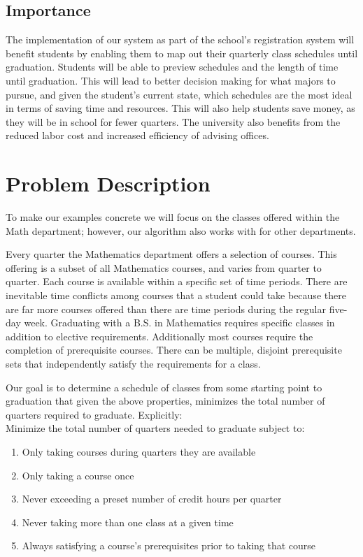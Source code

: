 \documentclass[11pt]{article} %
\begin{document}
\subsection{Importance} The implementation of our system as part of the school’s
registration system will benefit students by enabling them to map out their
quarterly class schedules until graduation. Students will be able to preview
schedules and the length of time until graduation.  This will lead to better
decision making for what majors to pursue, and given the student's current
state, which schedules are the most ideal in terms of saving time and resources.
This will also help students save money, as they will be in school for fewer
quarters. The university also benefits from the reduced labor cost and increased
efficiency of advising offices.

\section{Problem Description} \label{pdesc} To make our examples concrete we will focus on the
classes offered within the Math department; however, our algorithm also works with for other departments.

Every quarter the Mathematics department offers a selection of courses. This offering is a
subset of all Mathematics courses, and varies from quarter to quarter.
Each course is available within a specific set of
time periods. There are inevitable time conflicts among courses that a student
could take because there are far more courses offered than there are time periods during
the regular five-day week. Graduating with a B.S. in Mathematics requires
specific classes in addition to elective requirements.
Additionally most courses require the completion of prerequisite courses.
There can be multiple, disjoint prerequisite sets that independently
satisfy the requirements for a class.

Our goal is to determine a schedule of classes from some starting point to
graduation that given the above properties, minimizes the total number of
quarters required to graduate. Explicitly: \\ Minimize the total
number of quarters needed to graduate subject to: \begin{enumerate} \item Only
taking courses during quarters they are available \item Only taking a course
once \item Never exceeding a preset number of credit hours per quarter \item
Never taking more than one class at a given time \item Always satisfying
a course's prerequisites prior to taking that course \end{enumerate}
\end{document}
